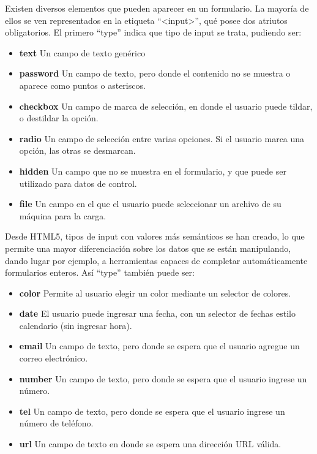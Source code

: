 Existen diversos elementos que pueden aparecer en un formulario. La mayoría de
ellos se ven representados en la etiqueta ``<input>'', qué posee dos atriutos
obligatorios. El primero ``type'' indica que tipo de input se trata, pudiendo ser:
\begin{itemize}
  \item \textbf{text} Un campo de texto genérico
  \item \textbf{password} Un campo de texto, pero donde el contenido no se muestra
    o aparece como puntos o asteriscos.
  \item \textbf{checkbox} Un campo de marca de selección, en donde el usuario
    puede tildar, o destildar la opción.
  \item \textbf{radio} Un campo de selección entre varias opciones. Si el usuario
    marca una opción, las otras se desmarcan.
  \item \textbf{hidden} Un campo que no se muestra en el formulario, y que puede
    ser utilizado para datos de control.
  \item \textbf{file} Un campo en el que el usuario puede seleccionar un archivo
    de su máquina para la carga.
\end{itemize}

Desde HTML5, tipos de input con valores más semánticos se han creado, lo que
permite una mayor diferenciación sobre los datos que se están manipulando,
dando lugar por ejemplo, a herramientas capaces de completar automáticamente
formularios enteros. Así ``type'' también puede ser:

\begin{itemize}
  \item \textbf{color} Permite al usuario elegir un color mediante un selector
    de colores.
  \item \textbf{date} El usuario puede ingresar una fecha, con un selector de
    fechas estilo calendario (sin ingresar hora).
  \item \textbf{email} Un campo de texto, pero donde se espera que el usuario
    agregue un correo electrónico.
  \item \textbf{number} Un campo de texto, pero donde se espera que el usuario
    ingrese un número.
  \item \textbf{tel} Un campo de texto, pero donde se espera que el usuario
    ingrese un número de teléfono.
  \item \textbf{url} Un campo de texto en donde se espera una dirección URL válida.
\end{itemize}

